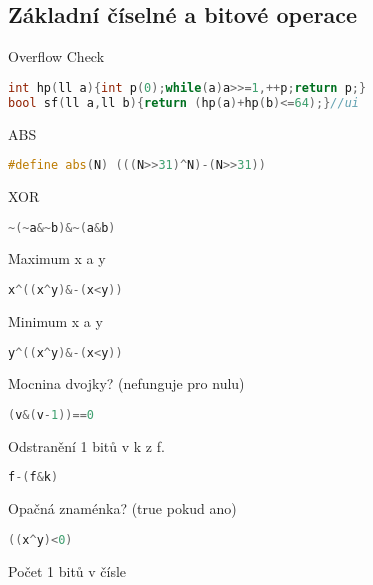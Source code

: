 \documentclass[11pt]{article}
\begin{document}
\subsection{Základní číselné a bitové operace}
\begin{center}
Overflow Check
\end{center}
\begin{lstlisting}[language=C++]
int hp(ll a){int p(0);while(a)a>>=1,++p;return p;}
bool sf(ll a,ll b){return (hp(a)+hp(b)<=64);}//ui
\end{lstlisting}
\begin{center}
ABS
\end{center}
\begin{lstlisting}[language=C++]
#define abs(N) (((N>>31)^N)-(N>>31))
\end{lstlisting}
\begin{center}
XOR
\end{center}
\begin{lstlisting}[language=C++]
~(~a&~b)&~(a&b)
\end{lstlisting}
\begin{center}
Maximum x a y
\end{center}
\begin{lstlisting}[language=C++]
x^((x^y)&-(x<y))
\end{lstlisting}
\begin{center}
Minimum x a y
\end{center}
\begin{lstlisting}[language=C++]
y^((x^y)&-(x<y))
\end{lstlisting}
\begin{center}
Mocnina dvojky? (nefunguje pro nulu)
\end{center}
\begin{lstlisting}[language=C++]
(v&(v-1))==0
\end{lstlisting}
\begin{center}
Odstranění 1 bitů v \textsf{k} z \textsf{f}.
\end{center}
\begin{lstlisting}[language=C++]
f-(f&k)
\end{lstlisting}
\begin{center}
Opačná znaménka? (true pokud ano)
\end{center}
\begin{lstlisting}[language=C++]
((x^y)<0)
\end{lstlisting}
\begin{center}
Počet 1 bitů v čísle
\end{center}
\end{document}
